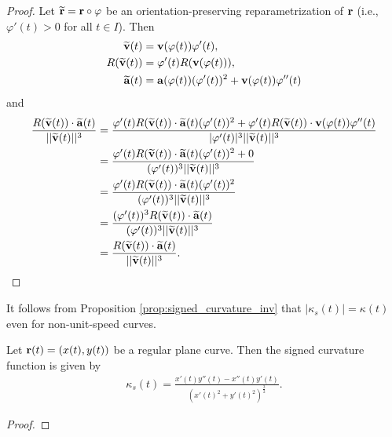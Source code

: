 \documentclass[12pt,letterpaper,reqno]{article}
\numberwithin{equation}{section}
\newcommand{\bv}{{\bf v}}
\newcommand{\ba}{{\bf a}}
\newcommand{\bbr}{{\bf r}}
\newcommand{\fixme}[1]{{\color{orange}{[#1]}}}
\begin{document}
{\begin{proof}
	Let $\widetilde{\bbr}=\bbr \circ \varphi$ be an orientation-preserving reparametrization of $\bbr$ (i.e., $\varphi'(t)>0$ for all $t \in I$). Then
	\begin{align*}
		\widetilde{\bv}(t)&=\bv(\varphi(t))\varphi'(t), \\
		R(\widetilde{\bv}(t))&=\varphi'(t)R(\bv(\varphi(t))), \\
		\widetilde{\ba}(t)&=\ba(\varphi(t))(\varphi'(t))^2+\bv(\varphi(t))\varphi''(t)
	\end{align*}
	and
	\begin{align*}
		\frac{R(\widetilde{\bv}(t))\cdot \widetilde{\ba}(t) }{||\widetilde{\bv}(t)||^3}&=\frac{\varphi'(t)R(\widetilde{\bv}(t)) \cdot \widetilde{\ba}(t)(\varphi'(t))^2+\varphi'(t)R(\widetilde{\bv}(t)) \cdot \bv(\varphi(t))\varphi''(t)}{|\varphi'(t)|^3||\widetilde{\bv}(t)||^3} \\
		&=\frac{\varphi'(t)R(\widetilde{\bv}(t)) \cdot \widetilde{\ba}(t)(\varphi'(t))^2+0}{(\varphi'(t))^3||\widetilde{\bv}(t)||^3} \\
		&=\frac{\varphi'(t)R(\widetilde{\bv}(t)) \cdot \widetilde{\ba}(t)(\varphi'(t))^2}{(\varphi'(t))^3||\widetilde{\bv}(t)||^3} \\
		&=\frac{(\varphi'(t))^3R(\widetilde{\bv}(t)) \cdot \widetilde{\ba}(t)}{(\varphi'(t))^3||\widetilde{\bv}(t)||^3} \\
		&=\frac{R(\widetilde{\bv}(t)) \cdot \widetilde{\ba}(t)}{||\widetilde{\bv}(t)||^3}. 
	\end{align*}
\end{proof}

It follows from Proposition \ref{prop:signed_curvature_inv} that $|\kappa_s(t)|=\kappa(t)$ even for non-unit-speed curves.

\begin{prop}
	Let $\bbr(t)=(x(t),y(t))$ be a regular plane curve. Then the signed curvature function is given by
	\begin{align*}
		\kappa_s(t)=\frac{x'(t)y''(t)-x''(t)y'(t)}{(x'(t)^2+y'(t)^2)^\frac{3}{2}}.
	\end{align*}
\end{prop}

\begin{proof}
	\fixme{Finish...}
\end{proof}

}
\end{document}

